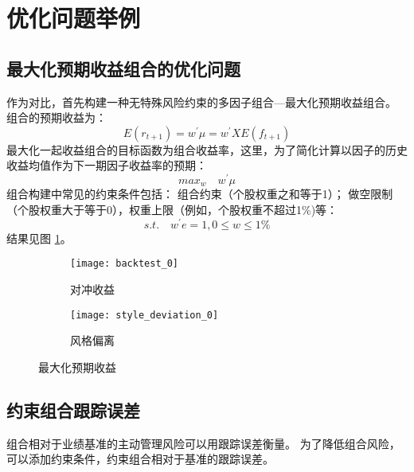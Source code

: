 \documentclass[UTF8,11pt]{ctexart}
\begin{document}

\section{优化问题举例}
\subsection{最大化预期收益组合的优化问题}
作为对比，首先构建一种无特殊风险约束的多因子组合---最大化预期收益组合。
组合的预期收益为：
\begin{equation}
E(r_{t+1})=w^\prime \mu=w^\prime X E(f_{t+1})
\end{equation}
最大化一起收益组合的目标函数为组合收益率，这里，为了简化计算以因子的历史收益均值作为下一期因子收益率的预期：
\begin{equation}
max_w\quad w^\prime \mu
\end{equation}
组合构建中常见的约束条件包括： 组合约束（个股权重之和等于1）； 做空限制（个股权重大于等于0），权重上限（例如，个股权重不超过1\%)等：
\begin{equation}
s.t. \quad w^\prime e=1, 0\le w \le 1\%
\end{equation}
结果见图 \ref{fig:figs0}。

\begin{figure}
	\centering
	\begin{subfigure}[b]{0.45\textwidth}
		\centering
		\texttt{[image: backtest\_0]}
		\caption{对冲收益}
	\end{subfigure}
	\hfill
	\begin{subfigure}[b]{0.45\textwidth}
		\centering
		\texttt{[image: style\_deviation\_0]}
		\caption{风格偏离}
	\end{subfigure}
	\caption{最大化预期收益}
	\label{fig:figs0}
\end{figure}


\subsection{约束组合跟踪误差}
组合相对于业绩基准的主动管理风险可以用跟踪误差衡量。 为了降低组合风险，可以添加约束条件，约束组合相对于基准的跟踪误差。
\end{document}
